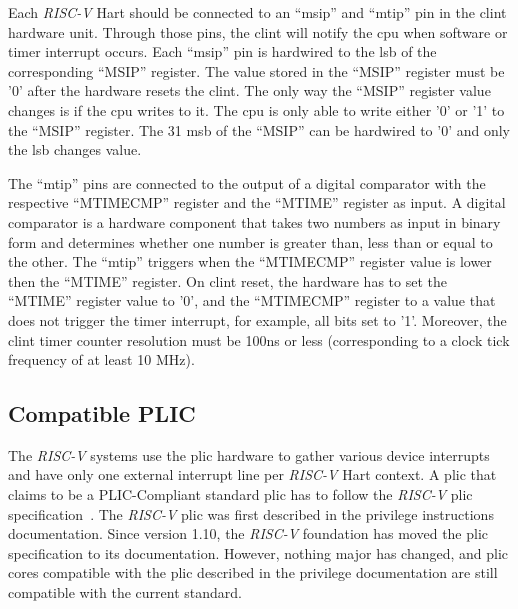 Each \textit{RISC-V} Hart should be connected to an \enquote{msip} and \enquote{mtip} pin in the \acrshort{clint} hardware unit. Through those pins, the \acrshort{clint} will notify the \acrshort{cpu} when software or timer interrupt occurs. Each \enquote{msip} pin is hardwired to the \acrshort{lsb} of the corresponding \enquote{MSIP} register. The value stored in the \enquote{MSIP} register must be '0' after the hardware resets the \acrshort{clint}. The only way the \enquote{MSIP} register value changes is if the \acrshort{cpu} writes to it. The \acrshort{cpu} is only able to write either '0' or '1' to the \enquote{MSIP} register. The 31 \acrshort{msb} of the \enquote{MSIP} can be hardwired to '0' and only the \acrshort{lsb} changes value.

The \enquote{mtip} pins are connected to the output of a digital comparator with the respective \enquote{MTIMECMP} register and the \enquote{MTIME} register as input. A digital comparator is a hardware component that takes two numbers as input in binary form and determines whether one number is greater than, less than or equal to the other. The \enquote{mtip} triggers when the \enquote{MTIMECMP} register value is lower then the \enquote{MTIME} register. On \acrshort{clint} reset, the hardware has to set the \enquote{MTIME} register value to '0', and the \enquote{MTIMECMP} register to a value that does not trigger the timer interrupt, for example, all bits set to '1'. Moreover, the \acrshort{clint} timer counter resolution must be 100ns or less (corresponding to a clock tick frequency of at least 10 MHz).

\subsection{Compatible PLIC}
\label{subsection:plic_riscv}
The \textit{RISC-V} systems use the \acrfull{plic} hardware to gather various device interrupts and have only one external interrupt line per \textit{RISC-V} Hart context. A \acrshort{plic} that claims to be a PLIC-Compliant standard \acrshort{plic} has to follow the \textit{RISC-V} \acrshort{plic} specification~\cite{plic_riscv_spec}. The \textit{RISC-V} \acrshort{plic} was first described in the privilege instructions documentation. Since version 1.10, the \textit{RISC-V} foundation has moved the \acrshort{plic} specification to its documentation. However, nothing major has changed, and \acrshort{plic} cores compatible with the \acrshort{plic} described in the privilege documentation are still compatible with the current standard.

